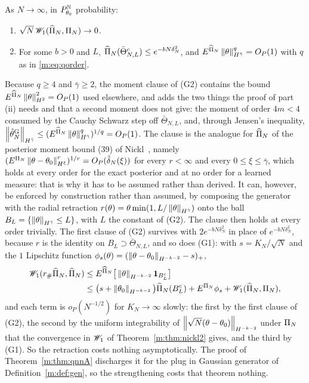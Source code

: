 \begin{assumption}\label{m:ass:G}
As $N\to\infty$, in $P^{\mathbb{N}}_{\theta_0}$ probability:
\begin{enumerate}[label=(G\arabic*),nosep]
\item $\sqrt N\,\mathscr{W}_1(\widehat\Pi_N,\Pi_N)\to0$.
\item For some $b>0$ and $L$, $\widehat\Pi_N(\bar\Theta_{N,L}^c)\le e^{-bN\delta_N^2}$, and $E^{\widehat\Pi_N}\left\|\theta\right\|^{q}_{H^{\bar\gamma}}=O_P(1)$ with $q$ as in \eqref{m:eq:qorder}.
\end{enumerate}
\end{assumption}

Because $q\ge4$ and $\bar\gamma\ge2$, the moment clause of (G2) contains the bound $E^{\widehat\Pi_N}\left\|\theta\right\|^2_{H^2}=O_P(1)$ used elsewhere, and adds the two things the proof of part (ii) needs and that a second moment does not give: the moment of order $4m<4$ consumed by the Cauchy Schwarz step off $\bar\Theta_{N,L}$, and, through Jensen's inequality, $\left\|\hat\theta^{\rm G}_N\right\|_{H^{\bar\gamma}}\le(E^{\widehat\Pi_N}\left\|\theta\right\|^q_{H^{\bar\gamma}})^{1/q}=O_P(1)$. The clause is the analogue for $\widehat\Pi_N$ of the posterior moment bound (39) of Nickl~\cite{nicklbvm2024}, namely $(E^{\Pi_N}\left\|\theta-\theta_0\right\|^r_{H^\xi})^{1/r}=O_P(\tilde\delta_N(\xi))$ for every $r<\infty$ and every $0\le\xi\le\bar\gamma$, which holds at every order for the exact posterior and at no order for a learned measure: that is why it has to be assumed rather than derived. It can, however, be enforced by construction rather than assumed, by composing the generator with the radial retraction $r(\theta)=\theta\min(1,L/\left\|\theta\right\|_{H^{\bar\gamma}})$ onto the ball $B_L=\{\left\|\theta\right\|_{H^{\bar\gamma}}\le L\}$, with $L$ the constant of (G2). The clause then holds at every order trivially. The first clause of (G2) survives with $2e^{-bN\delta_N^2}$ in place of $e^{-bN\delta_N^2}$, because $r$ is the identity on $B_L\supset\bar\Theta_{N,L}$, and so does (G1): with $s=K_N/\sqrt N$ and the $1$ Lipschitz function $\phi_s(\theta)=(\left\|\theta-\theta_0\right\|_{H^{-k-2}}-s)_+$,
\[
\begin{aligned}
\mathscr{W}_1(r_\#\widehat\Pi_N,\widehat\Pi_N)&\le E^{\widehat\Pi_N}\big[\left\|\theta\right\|_{H^{-k-2}}\mathbf 1_{B^c_L}\big]\\
&\le\big(s+\left\|\theta_0\right\|_{H^{-k-2}}\big)\widehat\Pi_N(B^c_L)+E^{\Pi_N}\phi_s+\mathscr{W}_1(\widehat\Pi_N,\Pi_N),
\end{aligned}
\]
and each term is $o_P(N^{-1/2})$ for $K_N\to\infty$ slowly: the first by the first clause of (G2), the second by the uniform integrability of $\left\|\sqrt N(\theta-\theta_0)\right\|_{H^{-k-2}}$ under $\Pi_N$ that the convergence in $\mathscr{W}_1$ of Theorem~\ref{m:thm:nickl2} gives, and the third by (G1). So the retraction costs nothing asymptotically. The proof of Theorem~\ref{m:thm:qnnA} discharges it for the plug in Gaussian generator of Definition~\ref{m:def:gen}, so the strengthening costs that theorem nothing.

